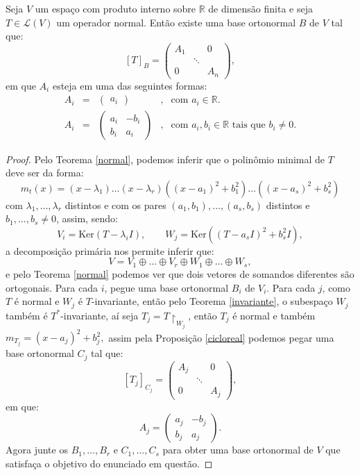 \documentclass[11pt,twoside,a4paper]{book}
\begin{document}
\begin{teorema}
Seja $V$ um espaço com produto interno sobre $\mathbb{R}$ de dimensão finita e seja $T\in\mathcal{L}(V)$ um operador normal. Então existe uma base ortonormal $B$ de $V$ tal que:
\[
[T]_B=\begin{pmatrix}
A_1&&0\\&\ddots&\\0&&A_n
\end{pmatrix},
\]
em que $A_i$ esteja em uma das seguintes formas:
\[
\begin{array}{ccccl}
A_i&=&\begin{pmatrix}
a_i
\end{pmatrix}&,&\text{com }a_i\in\mathbb{R}.\\
A_i&=&\begin{pmatrix}
a_i&-b_i\\b_i&a_i
\end{pmatrix}&,&\text{com }a_i,b_i\in\mathbb{R}\text{ tais que }b_i\neq 0.
\end{array}
\]
\end{teorema}
\begin{proof}
Pelo Teorema \ref{normal}, podemos inferir que o polinômio minimal de $T$ deve ser da forma:
\[
m_t(x)=\left(x-\lambda_1\right)\dots\left(x-\lambda_r\right)\left(\left(x-a_1\right)^2+b_1^2\right)\dots\left(\left(x-a_s\right)^2+b_s^2\right)
\]
com $\lambda_1,\dots,\lambda_r$ distintos e com os pares $(a_1,b_1),\dots,(a_s,b_s)$ distintos e $b_1,\dots,b_s\neq 0$, assim, sendo:
\[
V_i=\mathrm{Ker}\left(T-\lambda_iI\right),\quad\quad W_j=\mathrm{Ker}\left(\left(T-a_sI\right)^2+b_s^2I\right),
\]
a decomposição primária nos permite inferir que:
\[
V=V_1\oplus\dots\oplus V_r\oplus W_1\oplus\dots\oplus W_s,
\]
e pelo Teorema \ref{normal} podemos ver que dois vetores de somandos diferentes são ortogonais. Para cada $i$, pegue uma base ortonormal $B_i$ de $V_i$. Para cada $j$, como $T$ é normal e $W_j$ é $T$-invariante, então pelo Teorema \ref{invariante}, o subespaço $W_j$ também é $T^*$-invariante, aí seja $T_j=T\upharpoonright_{W_j}$, então $T_j$ é normal e também $m_{T_j}=(x-a_j)^2+b_j^2,$ assim pela Proposição \ref{cicloreal} podemos pegar uma base ortonormal $C_j$ tal que:
\[
[T_j]_{C_j}=\begin{pmatrix}
A_j&&0\\&\ddots&\\0&&A_j
\end{pmatrix},
\]
em que:
\[
A_j=\begin{pmatrix}
a_j&-b_j\\b_j&a_j
\end{pmatrix}.
\]
Agora junte os $B_1,\dots,B_r$ e $C_1,\dots,C_s$ para obter uma base ortonormal de $V$ que satisfaça o objetivo do enunciado em questão.
\end{proof}
\end{document}
